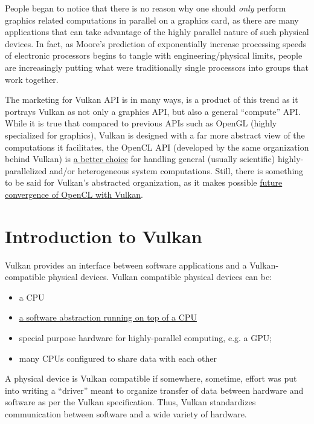 \documentclass[12pt,letterpaper]{article}
\newcommand{\inquotes}[1]{``#1''}	%
\begin{document}
People began to notice that there is no reason why one should \emph{only} perform graphics related computations in parallel on a graphics card, as there are many applications that can take advantage of the highly parallel nature of such physical devices. In fact, as Moore's prediction of exponentially increase processing speeds of electronic processors begins to tangle with engineering/physical limits, people are increasingly putting what were traditionally single processors into groups that work together. 

The marketing for Vulkan API is in many ways, is a product of this trend as it portrays Vulkan as not only a graphics API, but also a general \inquotes{compute} API. While it is true that compared to previous APIs such as OpenGL (highly specialized for graphics), Vulkan is designed with a far more abstract view of the computations it facilitates, the OpenCL API (developed by the same organization behind Vulkan) is \href{https://www.lunarg.com/faqs/vulkan-opencl-general-computing/}{a better choice} for handling general (usually scientific) highly-parallelized and/or heterogeneous system computations. Still, there is something to be said for Vulkan's abstracted organization, as it makes possible \href{https://www.lunarg.com/faqs/vulkan-opencl-interoperability/}{future convergence of OpenCL with Vulkan}.


\section{Introduction to Vulkan}

Vulkan provides an interface between software applications and a Vulkan-compatible physical devices. Vulkan compatible physical devices can be:
	\begin{itemize}
		\item a CPU
		\item \href{https://www.reddit.com/r/vulkan/comments/5f7jhn/is_it_possible_to_run_vulkan_on_cpu/}{a software abstraction running on top of a CPU}
		\item special purpose hardware for highly-parallel computing, e.g. a GPU;
		\item many CPUs configured to share data with each other
	\end{itemize}
A physical device is Vulkan compatible if somewhere, sometime, effort was put into writing a \inquotes{driver} meant to organize transfer of data between hardware and software as per the Vulkan specification. Thus, Vulkan standardizes communication between software and a wide variety of hardware.
\end{document}
